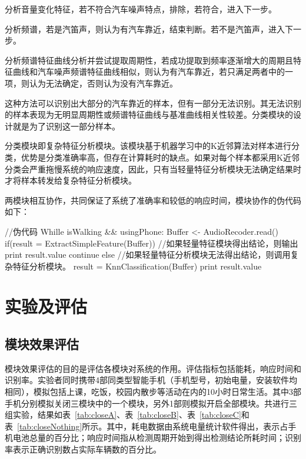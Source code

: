 \begin{compactenum}
\item 分析音量变化特征，若不符合汽车噪声特点，排除，若符合，进入下一步。
\item 分析频谱，若是汽笛声，则认为有汽车靠近，结束判断。若不是汽笛声，进入下一步。
\item 分析频谱特征曲线分析并尝试提取周期性，若成功提取到频率逐渐增大的周期且特征曲线和汽车噪声频谱特征曲线相似，则认为有汽车靠近，若只满足两者中的一项，则认为无法确定，否则认为没有汽车靠近。
\end{compactenum}

这种方法可以识别出大部分的汽车靠近的样本，但有一部分无法识别。其无法识别的样本表现为无明显周期性或频谱特征曲线与基准曲线相关性较差。分类模块的设计就是为了识别这一部分样本。

分类模块即复杂特征分析模块。该模块基于机器学习中的K近邻算法对样本进行分类，优势是分类准确率高，但存在计算耗时的缺点。如果对每个样本都采用K近邻分类会严重拖慢系统的响应速度，因此，只有当轻量特征分析模块无法确定结果时才将样本转发给复杂特征分析模块。

两模块相互协作，共同保证了系统了准确率和较低的响应时间，模块协作的伪代码如下：

\begin{code}[numbers=none]
//伪代码
Whille isWalking && usingPhone:
    Buffer <- AudioRecoder.read()
    if(result = ExtractSimpleFeature(Buffer))
        //如果轻量特征模块得出结论，则输出
        print result.value
        continue
    else
        //如果轻量特征分析模块无法得出结论，则调用复杂特征分析模块。
        result = KnnClassification(Buffer)
        print result.value

\end{code}



\section{实验及评估}

\subsection{模块效果评估}
模块效果评估的目的是评估各模块对系统的作用。评估指标包括能耗，响应时间和识别率。实验者同时携带4部同类型智能手机（手机型号，初始电量，安装软件均相同），模拟包括上课，吃饭，校园内散步等活动在内的10小时日常生活。其中3部手机分别模拟关闭三模块中的一个模块，另外1部则模拟开启全部模块。共进行三组实验，结果如表~\ref{tab:closeA}、表~\ref{tab:closeB}、表~\ref{tab:closeC}和表~\ref{tab:closeNothing}所示。其中，耗电数据由系统电量统计软件得出，表示占手机电池总量的百分比；响应时间指从检测周期开始到得出检测结论所耗时间；识别率表示正确识别数占实际车辆数的百分比。


